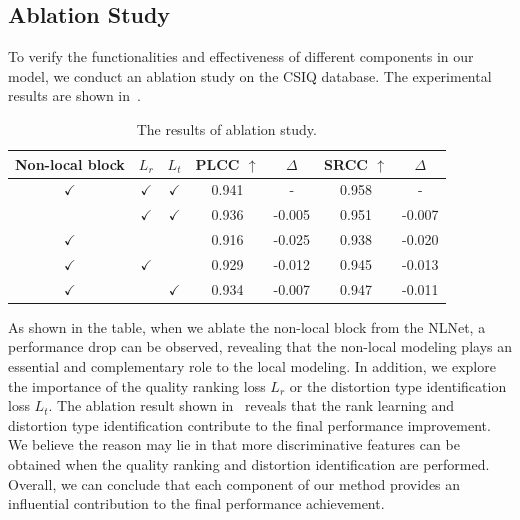 \subsection{Ablation Study}\label{Ablation Study}
To verify the functionalities and effectiveness of different components in our model, we conduct an ablation study on the CSIQ database. The experimental results are shown in~.
\begin{table}[!ht]
	\centering
	\caption{The results of ablation study.}
	\label{Ablation Study of different modules}
	\begin{tabular}{ccc|cc|cc}
		\toprule
		Non-local block & ${L}_{r}$ & ${L}_{t}$ & PLCC $\uparrow$ & $\Delta$ & SRCC $\uparrow$ & $\Delta$ \\ \hline
		$\checkmark$ & $\checkmark$ & $\checkmark$ & 0.941 & - & 0.958 & - \\ \hline
		& $\checkmark$ & $\checkmark$ & 0.936 & -0.005 & 0.951 & -0.007 \\
		$\checkmark$ &  &  & 0.916 & -0.025 & 0.938 & -0.020 \\
		$\checkmark$ & $\checkmark$ &  & 0.929 & -0.012 & 0.945 & -0.013 \\
		$\checkmark$ &  & $\checkmark$ & 0.934 & -0.007 & 0.947 & -0.011 \\ 
		\bottomrule
	\end{tabular}
\end{table}
As shown in the table, when we ablate the non-local block from the NLNet, a performance drop can be observed, revealing that the non-local modeling plays an essential and complementary role to the local modeling. In addition, we explore the importance of the quality ranking loss ${L}_{r}$ or the distortion type identification loss ${L}_{t}$. The ablation result shown in~ reveals that the rank learning and distortion type identification contribute to the final performance improvement. We believe the reason may lie in that more discriminative features can be obtained when the quality ranking and distortion identification are performed. Overall, we can conclude that each component of our method provides an influential contribution to the final performance achievement. 
